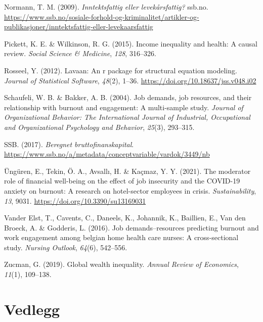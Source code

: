 \documentclass[
  12pt,
  a4paper,
  DIV=11,
  numbers=noendperiod]{scrartcl}
\newlength{\cslhangindent}
\newenvironment{CSLReferences}[2] %
 {\begin{list}{}{%
  \setlength{\itemindent}{0pt}
  \setlength{\leftmargin}{0pt}
  \setlength{\parsep}{0pt}
  \ifodd #1
   \setlength{\leftmargin}{\cslhangindent}
   \setlength{\itemindent}{-1\cslhangindent}
  \fi
  \setlength{\itemsep}{#2\baselineskip}}}
 {\end{list}}
\begin{document}
\begin{CSLReferences}{1}{0}
Normann, T. M. (2009). \emph{Inntektsfattig eller levekårsfattig?}
ssb.no.
\url{https://www.ssb.no/sosiale-forhold-og-kriminalitet/artikler-og-publikasjoner/inntektsfattig-eller-levekaarsfattig}

Pickett, K. E. \& Wilkinson, R. G. (2015). Income inequality and health:
A causal review. \emph{Social Science \& Medicine}, \emph{128},
316--326.

Rosseel, Y. (2012). Lavaan: An r package for structural equation
modeling. \emph{Journal of Statistical Software}, \emph{48}(2), 1--36.
\url{https://doi.org/10.18637/jss.v048.i02}

Schaufeli, W. B. \& Bakker, A. B. (2004). Job demands, job resources,
and their relationship with burnout and engagement: A multi-sample
study. \emph{Journal of Organizational Behavior: The International
Journal of Industrial, Occupational and Organizational Psychology and
Behavior}, \emph{25}(3), 293--315.

SSB. (2017). \emph{Beregnet bruttofinanskapital}.
\url{https://www.ssb.no/a/metadata/conceptvariable/vardok/3449/nb}

Üngüren, E., Tekin, Ö. A., Avsallı, H. \& Kaçmaz, Y. Y. (2021). The
moderator role of financial well-being on the effect of job insecurity
and the COVID-19 anxiety on burnout: A research on hotel-sector
employees in crisis. \emph{Sustainability}, \emph{13}, 9031.
\url{https://doi.org/10.3390/su13169031}

Vander Elst, T., Cavents, C., Daneels, K., Johannik, K., Baillien, E.,
Van den Broeck, A. \& Godderis, L. (2016). Job demands--resources
predicting burnout and work engagement among belgian home health care
nurses: A cross-sectional study. \emph{Nursing Outlook}, \emph{64}(6),
542--556.

Zucman, G. (2019). Global wealth inequality. \emph{Annual Review of
Economics}, \emph{11}(1), 109--138.

\end{CSLReferences}

\newpage

\section*{Vedlegg}\label{vedlegg}
\end{document}

